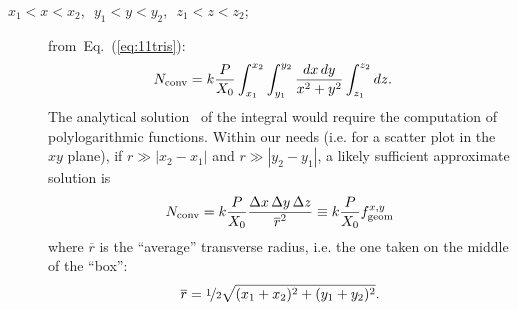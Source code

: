 \begin{description}
%
%
\item[$x_1<x<x_2$,~$\, y_1<y<y_2$,~$\, z_1<z<z_2$;]
  from~Eq.~(\ref{eq:11tris}): 
\begin{equation}
\begin{split}
N_{\rm conv} & = k
\frac{P}{X_0} \int_{x_1}^{x_2} \int_{y_1}^{y_2} \frac{dx\,
  dy }{x^2+y^2} \int_{z_1}^{z_2} dz  . 
\end{split}
\label{eq:14}
\end{equation}
The analytical solution~\cite{integrals} of the integral would require the computation of polylogarithmic functions. Within
our needs (i.e. for a scatter plot in the $xy$ plane), if $r\gg |x_2-x_1|$ and $r\gg |y_2
- y_1|$, a likely sufficient approximate
solution is
\begin{equation}
N_{\rm conv} = k
\frac{P}{X_0} \frac{\Delta x\, \Delta y\, \Delta z}{\overline{r}^2} \equiv k \frac{P}{X_0} f^{x, y}_{\rm geom}
\label{eq:15}
\end{equation}
where $\overline{r}$ is the ``average'' transverse radius, i.e. the one taken on
the middle of the ``box'':
\begin{equation}
 \overline{r}=\nicefrac{1}{2}\sqrt{(x_1+x_2)^2+(y_1+y_2)^2}.
\label{eq:16}
\end{equation}

\end{description}
